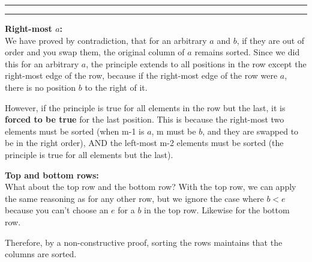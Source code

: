 \documentclass[11pt]{article}
\newcounter{questionCounter}
\newcounter{partCounter}[questionCounter]
\newenvironment{question}[2][\arabic{questionCounter}]{%
    \setcounter{partCounter}{0}%
    \vspace{.25in} \hrule \vspace{0.5em}%
        \noindent{\bf #2}%
    \vspace{0.8em} \hrule \vspace{.10in}%
    \addtocounter{questionCounter}{1}%
}{}
\begin{document}
\begin{question}{Your Wandering Mind}
\textbf{Right-most $a$:}\\
We have proved by contradiction, that for an arbitrary $a$ and $b$, if they are 
out of order and you swap them, the original column of $a$ remains sorted. Since
we did this for an arbitrary $a$, the principle extends to all positions in the 
row except the right-most edge of the row, because if the right-most edge of the
row were $a$, there is no position $b$ to the right of it.

However, if the principle is true for all elements in the row but the last, 
it is \textbf{forced to be true} for the last position. This is because the right-most 
two elements must be sorted (when m-1 is $a$, m must be $b$, and they are swapped 
to be in the right order), AND the left-most m-2 elements must be sorted (the
principle is true for all elements but the last).

\textbf{Top and bottom rows:}\\
What about the top row and the bottom row? With the top row, we can apply the 
same reasoning as for any other row, but we ignore the case where $b < e$ because
you can't choose an $e$ for a $b$ in the top row. Likewise for the bottom row.

Therefore, by a non-constructive proof, sorting the rows maintains that the 
columns are sorted.

\end{question}
\end{document}
